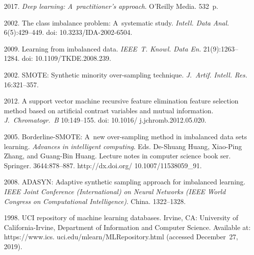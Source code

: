   \begin{multicols}{2}

\renewcommand{\bibname}{\protect\rmfamily References}

{\small\frenchspacing
 {%
 \begin{thebibliography}{99}
 2017. \textit{Deep learning: A~practitioner's approach}. 
O'Reilly Media. 532~p.

 2002. The class imbalance problem: A~systematic study. 
\textit{Intell. Data Anal.} 6(5):429--449. doi: 10.3233/IDA-2002-6504.

 2009. Learning from imbalanced data. \textit{IEEE~T. 
Knowl. Data En.} 21(9):1263--1284. doi: 10.1109/TKDE.2008.239.


 2002. SMOTE: 
Synthetic minority over-sampling technique. \textit{J.~Artif. Intell. Res.} 
16:321--357.

 2012. A support vector machine recursive feature 
elimination feature selection method based on artificial contrast variables and mutual information. 
\textit{J.~Chromatogr.~B} 
10:149--155. doi: 10.1016/ j.jchromb.2012.05.020.

 2005. Borderline-SMOTE: A~new  
over-sampling method in imbalanced data sets learning. \textit{Advances  
in intelligent computing}. 
Eds. De-Shuang Huang, Xiao-Ping Zhang, and Guang-Bin Huang. 
Lecture notes in computer science book ser. Springer.
3644:878--887. http://dx.doi.org/ 10.1007/11538059\_91.

 2008. ADASYN: Adaptive synthetic sampling 
approach for imbalanced learning. \textit{IEEE Joint Conference (International) on Neural 
Networks (IEEE World Congress on Computational Intelligence)}. China. 1322--1328.

 1998. UCI repository
 of machine learning databases. 
Irvine, CA: University of California-Irvine, Department of Information 
and Computer Science. Available at: 
{\sf https://www.ics. uci.edu/mlearn/MLRepository.html} (accessed December~27, 2019).



\end{thebibliography}}}
\end{multicols}
